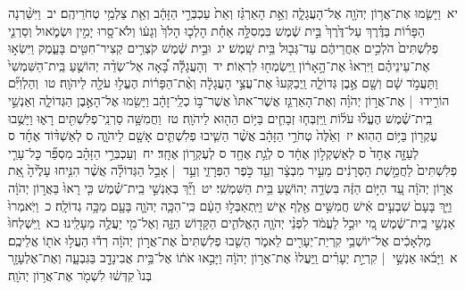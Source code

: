 \documentclass[18pt]{article}
\begin{document}
 {\loc יא~}וַיָּשִׂ֛מוּ אֶת־אֲר֥וֹן יְהֹוָ֖ה אֶל־הָעֲגָלָ֑ה וְאֵ֣ת הָאַרְגַּ֗ז וְאֵת֙ עַכְבְּרֵ֣י הַזָּהָ֔ב וְאֵ֖ת צַלְמֵ֥י טְחֹרֵיהֶֽם׃ \startlock
 {\loc יב~}וַיִּשַּׁ֨רְנָה הַפָּר֜וֹת בַּדֶּ֗רֶךְ עַל־דֶּ֙רֶךְ֙ בֵּ֣ית שֶׁ֔מֶשׁ בִּמְסִלָּ֣ה אַחַ֗ת הָלְכ֤וּ הָלֹךְ֙ וְגָע֔וֹ וְלֹא־סָ֖רוּ יָמִ֣ין וּשְׂמֹ֑אול וְסַרְנֵ֤י פְלִשְׁתִּים֙ הֹלְכִ֣ים אַחֲרֵיהֶ֔ם עַד־גְּב֖וּל בֵּ֥ית שָֽׁמֶשׁ׃ \startlock
 {\loc יג~}וּבֵ֣ית שֶׁ֔מֶשׁ קֹצְרִ֥ים קְצִיר־חִטִּ֖ים בָּעֵ֑מֶק וַיִּשְׂא֣וּ אֶת־עֵינֵיהֶ֗ם וַיִּרְאוּ֙ אֶת־הָ֣אָר֔וֹן וַֽיִּשְׂמְח֖וּ לִרְאֽוֹת׃ \startlock
 {\loc יד~}וְהָעֲגָלָ֡ה בָּ֠אָה אֶל־שְׂדֵ֨ה יְהוֹשֻׁ֤עַ בֵּֽית־הַשִּׁמְשִׁי֙ וַתַּעֲמֹ֣ד שָׁ֔ם וְשָׁ֖ם אֶ֣בֶן גְּדוֹלָ֑ה וַֽיְבַקְּעוּ֙ אֶת־עֲצֵ֣י הָעֲגָלָ֔ה וְאֶ֨ת־הַפָּר֔וֹת הֶעֱל֥וּ עֹלָ֖ה לַיהֹוָֽה׃ \startlock
 {\loc טו~}וְהַלְוִיִּ֞ם הוֹרִ֣ידוּ  |  אֶת־אֲר֣וֹן יְהֹוָ֗ה וְאֶת־הָאַרְגַּ֤ז אֲשֶׁר־אִתּוֹ֙ אֲשֶׁר־בּ֣וֹ כְלֵֽי־זָהָ֔ב וַיָּשִׂ֖מוּ אֶל־הָאֶ֣בֶן הַגְּדוֹלָ֑ה וְאַנְשֵׁ֣י בֵֽית־שֶׁ֗מֶשׁ הֶעֱל֨וּ עֹל֜וֹת וַֽיִּזְבְּח֧וּ זְבָחִ֛ים בַּיּ֥וֹם הַה֖וּא לַיהֹוָֽה׃ \startlock
 {\loc טז~}וַחֲמִשָּׁ֥ה סַרְנֵֽי־פְלִשְׁתִּ֖ים רָא֑וּ וַיָּשֻׁ֥בוּ עֶקְר֖וֹן בַּיּ֥וֹם הַהֽוּא׃ \startlock
 {\loc יז~}וְאֵ֙לֶּה֙ טְחֹרֵ֣י הַזָּהָ֔ב אֲשֶׁ֨ר הֵשִׁ֧יבוּ פְלִשְׁתִּ֛ים אָשָׁ֖ם לַיהֹוָ֑ה {ס}     לְאַשְׁדּ֨וֹד אֶחָ֜ד {ס}     לְעַזָּ֤ה אֶחָד֙ {ס}     לְאַשְׁקְל֣וֹן אֶחָ֔ד {ס}     לְגַ֥ת אֶחָ֖ד {ס}     לְעֶקְר֥וֹן אֶחָֽד׃ \startlock
 {\loc יח~}וְעַכְבְּרֵ֣י הַזָּהָ֗ב מִסְפַּ֞ר כׇּל־עָרֵ֤י פְלִשְׁתִּים֙ לַחֲמֵ֣שֶׁת הַסְּרָנִ֔ים מֵעִ֣יר מִבְצָ֔ר וְעַ֖ד כֹּ֣פֶר הַפְּרָזִ֑י וְעַ֣ד  |  אָבֵ֣ל הַגְּדוֹלָ֗ה אֲשֶׁ֨ר הִנִּ֤יחוּ עָלֶ֙יהָ֙ אֵ֚ת אֲר֣וֹן יְהֹוָ֔ה עַ֚ד הַיּ֣וֹם הַזֶּ֔ה בִּשְׂדֵ֥ה יְהוֹשֻׁ֖עַ בֵּ֥ית הַשִּׁמְשִֽׁי׃ \startlock
 {\loc יט~}וַיַּ֞ךְ בְּאַנְשֵׁ֣י בֵֽית־שֶׁ֗מֶשׁ כִּ֤י רָאוּ֙ בַּאֲר֣וֹן יְהֹוָ֔ה וַיַּ֤ךְ בָּעָם֙ שִׁבְעִ֣ים אִ֔ישׁ חֲמִשִּׁ֥ים אֶ֖לֶף אִ֑ישׁ וַיִּֽתְאַבְּל֣וּ הָעָ֔ם כִּֽי־הִכָּ֧ה יְהֹוָ֛ה בָּעָ֖ם מַכָּ֥ה גְדוֹלָֽה׃ \startlock
 {\loc כ~}וַיֹּֽאמְרוּ֙ אַנְשֵׁ֣י בֵֽית־שֶׁ֔מֶשׁ מִ֚י יוּכַ֣ל לַעֲמֹ֔ד לִפְנֵ֨י יְהֹוָ֧ה הָאֱלֹהִ֛ים הַקָּד֖וֹשׁ הַזֶּ֑ה וְאֶל־מִ֖י יַעֲלֶ֥ה מֵעָלֵֽינוּ׃ \startlock
 {\loc כא~}וַֽיִּשְׁלְחוּ֙ מַלְאָכִ֔ים אֶל־יוֹשְׁבֵ֥י קִרְיַת־יְעָרִ֖ים לֵאמֹ֑ר הֵשִׁ֤בוּ פְלִשְׁתִּים֙ אֶת־אֲר֣וֹן יְהֹוָ֔ה רְד֕וּ הַעֲל֥וּ אֹת֖וֹ אֲלֵיכֶֽם׃ 
\startlock
 {\loc א~}וַיָּבֹ֜אוּ אַנְשֵׁ֣י  |  קִרְיַ֣ת יְעָרִ֗ים וַֽיַּעֲלוּ֙ אֶת־אֲר֣וֹן יְהֹוָ֔ה וַיָּבִ֣אוּ אֹת֔וֹ אֶל־בֵּ֥ית אֲבִינָדָ֖ב בַּגִּבְעָ֑ה וְאֶת־אֶלְעָזָ֤ר בְּנוֹ֙ קִדְּשׁ֔וּ לִשְׁמֹ֖ר אֶת־אֲר֥וֹן יְהֹוָֽה׃ \startlock
\end{document}
